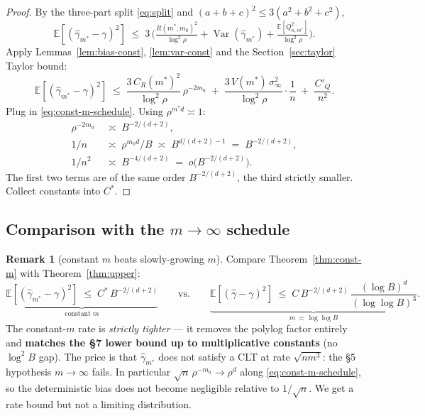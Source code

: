 \documentclass[11pt]{article}
\newcommand{\E}{\mathbb{E}}
\newcommand{\Var}{\operatorname{Var}}
\theoremstyle{plain}
\theoremstyle{definition}
\newtheorem{remark}[theorem]{Remark}
\begin{document}
\begin{proof}
By the three-part split \eqref{eq:split} and $(a+b+c)^{2}\le 3(a^{2}+b^{2}+c^{2})$,
\[
  \E[(\hat\gamma_{m^{\ast}} - \gamma)^{2}]
  \;\le\; 3\,\bigl(\tfrac{R(m^{\ast},m_0)^{2}}{\log^{2}\!\rho}
                + \Var(\hat\gamma_{m^{\ast}})
                + \tfrac{\E[Q_{n,m^{\ast}}^{2}]}{\log^{2}\!\rho}\bigr).
\]
Apply Lemmas~\ref{lem:bias-const}, \ref{lem:var-const} and the
Section~\ref{sec:taylor} Taylor bound:
\[
  \E[(\hat\gamma_{m^{\ast}} - \gamma)^{2}]
  \;\le\;
  \frac{3\,C_R(m^{\ast})^{2}}{\log^{2}\!\rho}\,\rho^{-2m_0}
  \;+\;
  \frac{3\,V(m^{\ast})\,\sigma_\infty^{2}}{\log^{2}\!\rho}\cdot\frac{1}{n}
  \;+\;
  \frac{C'_{Q}}{n^{2}}.
\]
Plug in \eqref{eq:const-m-schedule}. Using $\rho^{m^{\ast}d} \asymp 1$:
\begin{align*}
  \rho^{-2m_0}  &\;\asymp\; B^{-2/(d+2)},\\
  1/n           &\;\asymp\; \rho^{m_0 d}/B
                \;\asymp\; B^{d/(d+2)-1} \;=\; B^{-2/(d+2)},\\
  1/n^{2}       &\;\asymp\; B^{-4/(d+2)} \;=\; o\bigl(B^{-2/(d+2)}\bigr).
\end{align*}
The first two terms are of the same order $B^{-2/(d+2)}$, the third
strictly smaller. Collect constants into $C^{\ast}$.
\end{proof}

\subsection*{Comparison with the $m\to\infty$ schedule}

\begin{remark}[constant $m$ beats slowly-growing $m$]
Compare Theorem~\ref{thm:const-m} with Theorem~\ref{thm:upper}:
\[
  \underbrace{\E[(\hat\gamma_{m^{\ast}}-\gamma)^{2}] \;\le\; C^{\ast}\,B^{-2/(d+2)}}_{\text{constant }m}
  \qquad\text{vs.}\qquad
  \underbrace{\E[(\hat\gamma-\gamma)^{2}] \;\le\; C\,B^{-2/(d+2)}\,\frac{(\log B)^{d}}{(\log\log B)^{3}}}_{m\,\asymp\,\log\log B}.
\]
The constant-$m$ rate is \emph{strictly tighter} --- it removes the
polylog factor entirely and \textbf{matches the §7 lower bound up to
multiplicative constants} (no $\log^{2} B$ gap). The price is that
$\hat\gamma_{m^{\ast}}$ does not satisfy a CLT at rate
$\sqrt{nm^{3}}$: the §5 hypothesis $m\to\infty$ fails. In particular
$\sqrt{n}\,\rho^{-m_0} \to \rho^{d}$ along
\eqref{eq:const-m-schedule}, so the deterministic bias does not
become negligible relative to $1/\sqrt{n}$. We get a rate bound but
not a limiting distribution.
\end{remark}
\end{document}
